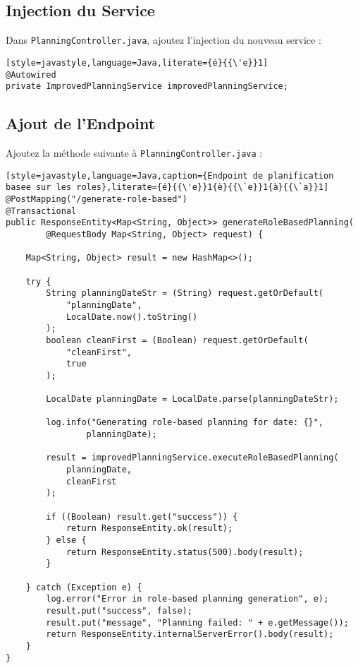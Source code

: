 \documentclass[11pt,a4paper]{article}
\begin{document}
    \subsection{Injection du Service}

    Dans \texttt{PlanningController.java}, ajoutez l'injection du nouveau service :

    \begin{lstlisting}[style=javastyle,language=Java,literate={é}{{\'e}}1]
@Autowired
private ImprovedPlanningService improvedPlanningService;
    \end{lstlisting}

    \subsection{Ajout de l'Endpoint}

    Ajoutez la méthode suivante à \texttt{PlanningController.java} :

    \begin{lstlisting}[style=javastyle,language=Java,caption={Endpoint de planification basee sur les roles},literate={é}{{\'e}}1{è}{{\`e}}1{à}{{\`a}}1]
@PostMapping("/generate-role-based")
@Transactional
public ResponseEntity<Map<String, Object>> generateRoleBasedPlanning(
        @RequestBody Map<String, Object> request) {

    Map<String, Object> result = new HashMap<>();

    try {
        String planningDateStr = (String) request.getOrDefault(
            "planningDate",
            LocalDate.now().toString()
        );
        boolean cleanFirst = (Boolean) request.getOrDefault(
            "cleanFirst",
            true
        );

        LocalDate planningDate = LocalDate.parse(planningDateStr);

        log.info("Generating role-based planning for date: {}",
                planningDate);

        result = improvedPlanningService.executeRoleBasedPlanning(
            planningDate,
            cleanFirst
        );

        if ((Boolean) result.get("success")) {
            return ResponseEntity.ok(result);
        } else {
            return ResponseEntity.status(500).body(result);
        }

    } catch (Exception e) {
        log.error("Error in role-based planning generation", e);
        result.put("success", false);
        result.put("message", "Planning failed: " + e.getMessage());
        return ResponseEntity.internalServerError().body(result);
    }
}
    \end{lstlisting}
\end{document}
